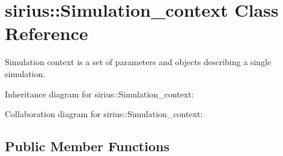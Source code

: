 \hypertarget{classsirius_1_1_simulation__context}{}\section{sirius\+:\+:Simulation\+\_\+context Class Reference}
\label{classsirius_1_1_simulation__context}


Simulation context is a set of parameters and objects describing a single simulation.  




Inheritance diagram for sirius\+:\+:Simulation\+\_\+context\+:


Collaboration diagram for sirius\+:\+:Simulation\+\_\+context\+:
\subsection*{Public Member Functions}
